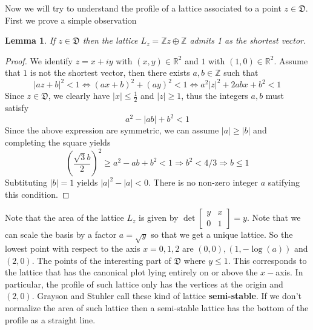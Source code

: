\documentclass[12pt]{article} %
\newtheorem{lemma}{Lemma}[section]
\begin{document}
Now we will try to understand the profile of a lattice associated to a point $z \in \mathfrak{D}$. First we
prove a simple observation
\begin{lemma}
  If $z \in \mathfrak{D}$ then the lattice $L_z = \mathbb{Z}z\oplus \mathbb{Z}$ admits 1 as the shortest vector.
\end{lemma}
\begin{proof}
  We identify $z = x+iy$ with $(x,y) \in \mathbb{R}^2$ and $1$ with $(1,0) \in \mathbb{R}^2$.
  Assume that $1$ is not the shortest vector, then there exists $a,b \in \mathbb{Z}$ such that
  \[ |az+b|^2 < 1 \Leftrightarrow (ax+b)^2+(ay)^2 < 1\Leftrightarrow a^2|z|^2+2abx+b^2< 1\]
  Since $z \in \mathfrak{D}$, we clearly have $|x| \le \frac{1}{2}$ and $|z| \ge 1$,  thus the integers $a,b$ must
  satisfy
  \[ a^2 -|ab|+b^2 < 1\]
  Since the above expression are symmetric, we can assume $|a| \ge |b|$ and completing the square yields
  \[\left(\dfrac{\sqrt{3}b}{2}\right)^2 \ge a^2-ab+b^2 <1 \Rightarrow b^2<4/3 \Rightarrow b \le 1\]
  Subtituting $|b|=1$ yields $|a|^2-|a|<0$. There is no non-zero integer $a$ satifying this condition.
\end{proof}
Note that the area of the lattice $L_z$ is given by $\det\begin{bmatrix}
    y & x \\
    0 & 1
  \end{bmatrix} = y$. Note that we can scale the basis by a factor $a=\sqrt{y}$ so that we get a unique lattice.
So the lowest point with respect to the axis $x = 0,1,2$ are $(0,0), (1,-\log(a))$ and $(2,0)$.
The points of the interesting part of $\mathfrak{D}$ where $y\le 1$. This corresponds to the lattice
that has the canonical plot lying entirely on or above the $x-$axis. In particular, the profile of such lattice
only has the vertices at the origin and $(2,0)$. Grayson and Stuhler call these kind of lattice
\textbf{semi-stable}. If we don't normalize the area of such lattice then a semi-stable
lattice has the bottom of the profile as a straight line.
\vspace{\baselineskip}
\end{document}
